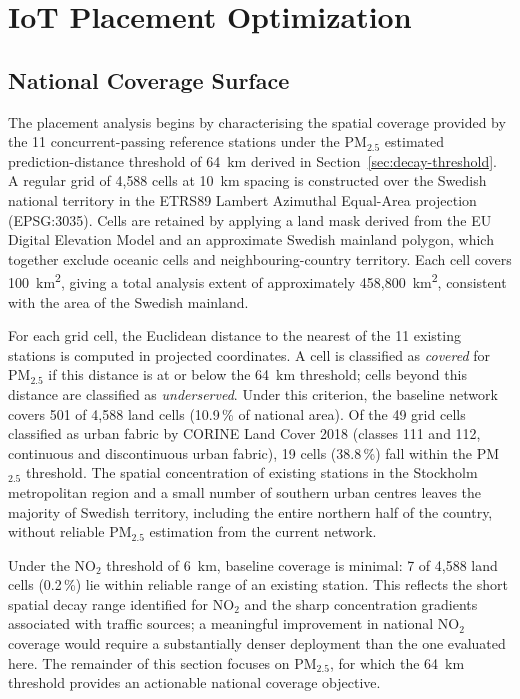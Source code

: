 \documentclass[11pt,a4paper]{article}
\let\oldsection\section
\renewcommand{\section}{\FloatBarrier\oldsection}
\let\oldsubsection\subsection
\renewcommand{\subsection}{\FloatBarrier\oldsubsection}
\begin{document}
\section{IoT Placement Optimization}
\label{sec:placement}

\subsection{National Coverage Surface}
\label{sec:coverage-surface}

The placement analysis begins by characterising the spatial coverage provided by the 11 concurrent-passing reference stations under the PM$_{2.5}$ estimated prediction-distance threshold of 64~km derived in Section~\ref{sec:decay-threshold}. A regular grid of 4{,}588 cells at 10~km spacing is constructed over the Swedish national territory in the ETRS89 Lambert Azimuthal Equal-Area projection (EPSG:3035). Cells are retained by applying a land mask derived from the EU Digital Elevation Model and an approximate Swedish mainland polygon, which together exclude oceanic cells and neighbouring-country territory. Each cell covers 100~km\textsuperscript{2}, giving a total analysis extent of approximately 458{,}800~km\textsuperscript{2}, consistent with the area of the Swedish mainland.

For each grid cell, the Euclidean distance to the nearest of the 11 existing stations is computed in projected coordinates. A cell is classified as \textit{covered} for PM$_{2.5}$ if this distance is at or below the 64~km threshold; cells beyond this distance are classified as \textit{underserved}. Under this criterion, the baseline network covers 501 of 4{,}588 land cells (10.9\,\% of national area). Of the 49 grid cells classified as urban fabric by CORINE Land Cover 2018 (classes 111 and 112, continuous and discontinuous urban fabric), 19 cells (38.8\,\%) fall within the PM$_{2.5}$ threshold. The spatial concentration of existing stations in the Stockholm metropolitan region and a small number of southern urban centres leaves the majority of Swedish territory, including the entire northern half of the country, without reliable PM$_{2.5}$ estimation from the current network.

Under the NO$_2$ threshold of 6~km, baseline coverage is minimal: 7 of 4{,}588 land cells (0.2\,\%) lie within reliable range of an existing station. This reflects the short spatial decay range identified for NO$_2$ and the sharp concentration gradients associated with traffic sources; a meaningful improvement in national NO$_2$ coverage would require a substantially denser deployment than the one evaluated here. The remainder of this section focuses on PM$_{2.5}$, for which the 64~km threshold provides an actionable national coverage objective.
\end{document}
